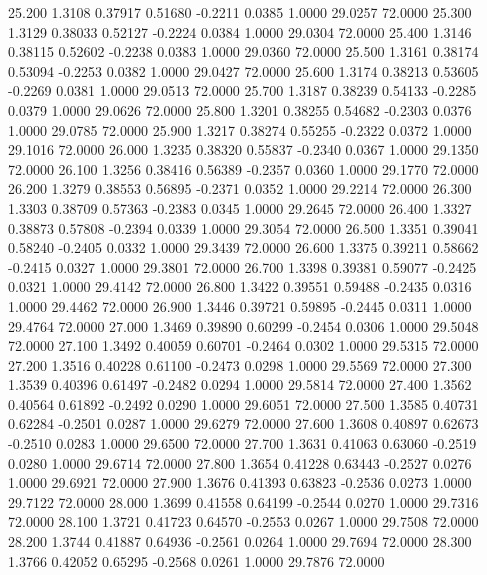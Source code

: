   25.200   1.3108   0.37917   0.51680  -0.2211   0.0385   1.0000  29.0257  72.0000
  25.300   1.3129   0.38033   0.52127  -0.2224   0.0384   1.0000  29.0304  72.0000
  25.400   1.3146   0.38115   0.52602  -0.2238   0.0383   1.0000  29.0360  72.0000
  25.500   1.3161   0.38174   0.53094  -0.2253   0.0382   1.0000  29.0427  72.0000
  25.600   1.3174   0.38213   0.53605  -0.2269   0.0381   1.0000  29.0513  72.0000
  25.700   1.3187   0.38239   0.54133  -0.2285   0.0379   1.0000  29.0626  72.0000
  25.800   1.3201   0.38255   0.54682  -0.2303   0.0376   1.0000  29.0785  72.0000
  25.900   1.3217   0.38274   0.55255  -0.2322   0.0372   1.0000  29.1016  72.0000
  26.000   1.3235   0.38320   0.55837  -0.2340   0.0367   1.0000  29.1350  72.0000
  26.100   1.3256   0.38416   0.56389  -0.2357   0.0360   1.0000  29.1770  72.0000
  26.200   1.3279   0.38553   0.56895  -0.2371   0.0352   1.0000  29.2214  72.0000
  26.300   1.3303   0.38709   0.57363  -0.2383   0.0345   1.0000  29.2645  72.0000
  26.400   1.3327   0.38873   0.57808  -0.2394   0.0339   1.0000  29.3054  72.0000
  26.500   1.3351   0.39041   0.58240  -0.2405   0.0332   1.0000  29.3439  72.0000
  26.600   1.3375   0.39211   0.58662  -0.2415   0.0327   1.0000  29.3801  72.0000
  26.700   1.3398   0.39381   0.59077  -0.2425   0.0321   1.0000  29.4142  72.0000
  26.800   1.3422   0.39551   0.59488  -0.2435   0.0316   1.0000  29.4462  72.0000
  26.900   1.3446   0.39721   0.59895  -0.2445   0.0311   1.0000  29.4764  72.0000
  27.000   1.3469   0.39890   0.60299  -0.2454   0.0306   1.0000  29.5048  72.0000
  27.100   1.3492   0.40059   0.60701  -0.2464   0.0302   1.0000  29.5315  72.0000
  27.200   1.3516   0.40228   0.61100  -0.2473   0.0298   1.0000  29.5569  72.0000
  27.300   1.3539   0.40396   0.61497  -0.2482   0.0294   1.0000  29.5814  72.0000
  27.400   1.3562   0.40564   0.61892  -0.2492   0.0290   1.0000  29.6051  72.0000
  27.500   1.3585   0.40731   0.62284  -0.2501   0.0287   1.0000  29.6279  72.0000
  27.600   1.3608   0.40897   0.62673  -0.2510   0.0283   1.0000  29.6500  72.0000
  27.700   1.3631   0.41063   0.63060  -0.2519   0.0280   1.0000  29.6714  72.0000
  27.800   1.3654   0.41228   0.63443  -0.2527   0.0276   1.0000  29.6921  72.0000
  27.900   1.3676   0.41393   0.63823  -0.2536   0.0273   1.0000  29.7122  72.0000
  28.000   1.3699   0.41558   0.64199  -0.2544   0.0270   1.0000  29.7316  72.0000
  28.100   1.3721   0.41723   0.64570  -0.2553   0.0267   1.0000  29.7508  72.0000
  28.200   1.3744   0.41887   0.64936  -0.2561   0.0264   1.0000  29.7694  72.0000
  28.300   1.3766   0.42052   0.65295  -0.2568   0.0261   1.0000  29.7876  72.0000
